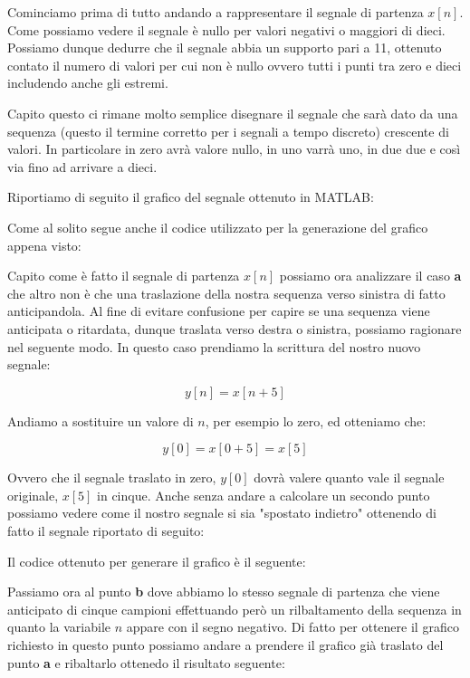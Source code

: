 \documentclass[../main.tex]{subfiles}
\begin{document}
Cominciamo prima di tutto andando a rappresentare il segnale di partenza $x[n]$. Come possiamo vedere il segnale è nullo per valori negativi o maggiori di dieci. Possiamo dunque dedurre che il segnale abbia un supporto pari a 11, ottenuto contato il numero di valori per cui non è nullo ovvero tutti i punti tra zero e dieci includendo anche gli estremi.

Capito questo ci rimane molto semplice disegnare il segnale che sarà dato da una sequenza (questo il termine corretto per i segnali a tempo discreto) crescente di valori. In particolare in zero avrà valore nullo, in uno varrà uno, in due due e così via fino ad arrivare a dieci.

Riportiamo di seguito il grafico del segnale ottenuto in MATLAB:


Come al solito segue anche il codice utilizzato per la generazione del grafico appena visto:




Capito come è fatto il segnale di partenza $x[n]$ possiamo ora analizzare il caso \textbf{a} che altro non è che una traslazione della nostra sequenza verso sinistra di fatto anticipandola.
Al fine di evitare confusione per capire se una sequenza viene anticipata o ritardata, dunque traslata verso destra o sinistra, possiamo ragionare nel seguente modo. In questo caso prendiamo la scrittura del nostro nuovo segnale:

\[ y[n] = x[n+5] \]

Andiamo a sostituire un valore di $n$, per esempio lo zero, ed otteniamo che:

\[ y[0] = x[0+5] = x[5] \]

Ovvero che il segnale traslato in zero, $y[0]$ dovrà valere quanto vale il segnale originale, $x[5]$ in cinque.
Anche senza andare a calcolare un secondo punto possiamo vedere come il nostro segnale si sia "spostato indietro" ottenendo di fatto il segnale riportato di seguito:


Il codice ottenuto per generare il grafico è il seguente:



Passiamo ora al punto \textbf{b} dove abbiamo lo stesso segnale di partenza che viene anticipato di cinque campioni effettuando però un rilbaltamento della sequenza in quanto la variabile $n$ appare con il segno negativo.
Di fatto per ottenere il grafico richiesto in questo punto possiamo andare a prendere il grafico già traslato del punto \textbf{a} e ribaltarlo ottenedo il risultato seguente:
\end{document}

